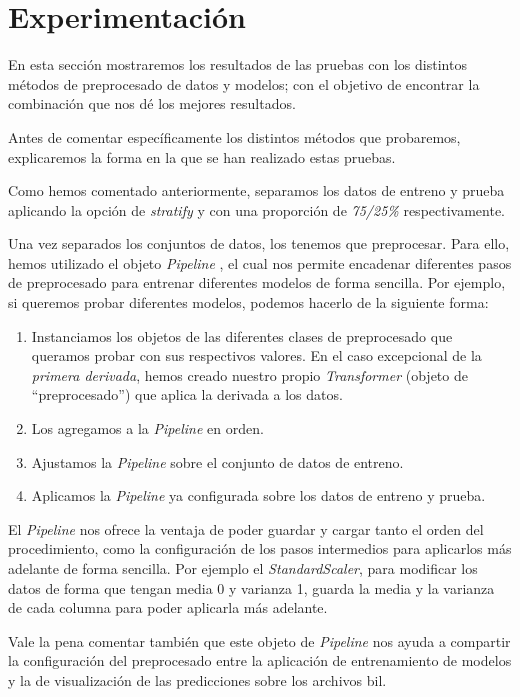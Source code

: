\section{Experimentación}

En esta sección mostraremos los resultados de las pruebas con los distintos métodos de preprocesado de datos y modelos; con el objetivo de encontrar la combinación que nos dé los mejores resultados.

Antes de comentar específicamente los distintos métodos que probaremos, explicaremos la forma en la que se han realizado estas pruebas.

Como hemos comentado anteriormente, separamos los datos de entreno y prueba aplicando la opción de \textit{stratify} y con una proporción de \textit{75/25\%} respectivamente.

Una vez separados los conjuntos de datos, los tenemos que preprocesar. Para ello, hemos utilizado el objeto \textit{Pipeline} \cite{sklearnp32:online}, el cual nos permite encadenar diferentes pasos de preprocesado para entrenar diferentes modelos de forma sencilla. Por ejemplo, si queremos probar diferentes modelos, podemos hacerlo de la siguiente forma: 

\begin{enumerate}
    \item Instanciamos los objetos de las diferentes clases de preprocesado que queramos probar con sus respectivos valores. En el caso excepcional de la \textit{primera derivada}, hemos creado nuestro propio \textit{Transformer} (objeto de ``preprocesado'') que aplica la derivada a los datos.
    \item Los agregamos a la \textit{Pipeline} en orden.
    \item Ajustamos la \textit{Pipeline} sobre el conjunto de datos de entreno.
    \item Aplicamos la \textit{Pipeline} ya configurada sobre los datos de entreno y prueba. 
\end{enumerate}


El \textit{Pipeline} nos ofrece la ventaja de poder guardar y cargar tanto el orden del procedimiento, como la configuración de los pasos intermedios para aplicarlos más adelante de forma sencilla. Por ejemplo el \textit{StandardScaler}, para modificar los datos de forma que tengan media 0 y varianza 1, guarda la media y la varianza de cada columna para poder aplicarla más adelante.

Vale la pena comentar también que este objeto de \textit{Pipeline} nos ayuda a compartir la configuración del preprocesado entre la aplicación de entrenamiento de modelos y la de visualización de las predicciones sobre los archivos \gls{bil}.


